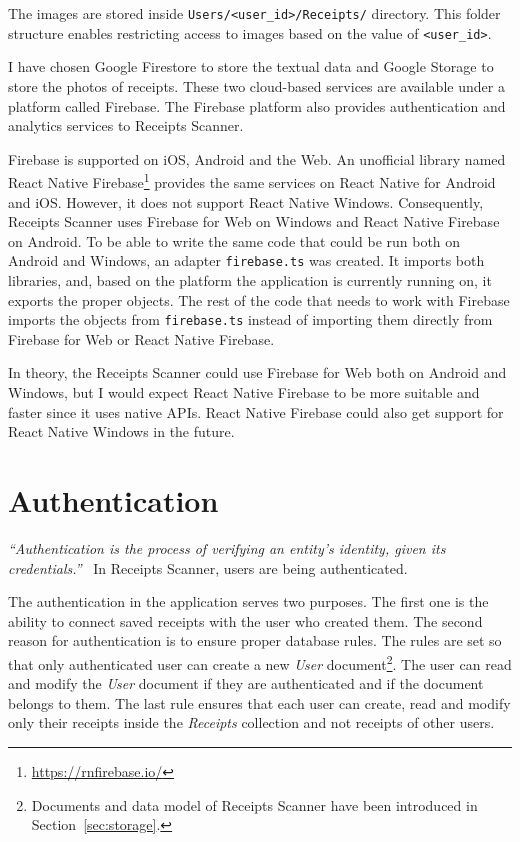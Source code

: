 \documentclass[
  digital, %
  table,   %
  oneside, %
  lof,     %
  lot,     %
]{fithesis3}
\begin{document}
The images are stored inside \texttt{Users/<user\_id>/Receipts/} directory. This folder structure enables restricting access to images based on the value of \texttt{<user\_id>}.

I have chosen Google Firestore to store the textual data and Google Storage to store the photos of receipts. These two cloud-based services are available under a platform called Firebase. The Firebase platform also provides authentication and analytics services to Receipts Scanner.

\label{phantom:firebase_adapter}
Firebase is supported on iOS, Android and the Web. An unofficial library named React Native Firebase\footnote{\url{https://rnfirebase.io/}} provides the same services on React Native for Android and iOS. However, it does not support React Native Windows. Consequently, Receipts Scanner uses Firebase for Web on Windows and React Native Firebase on Android. To be able to write the same code that could be run both on Android and Windows, an adapter \texttt{firebase.ts} was created. It imports both libraries, and, based on the platform the application is currently running on, it exports the proper objects. The rest of the code that needs to work with Firebase imports the objects from \texttt{firebase.ts} instead of importing them directly from Firebase for Web or React Native Firebase.

In theory, the Receipts Scanner could use Firebase for Web both on Android and Windows, but I would expect React Native Firebase to be more suitable and faster since it uses native APIs. React Native Firebase could also get support for React Native Windows in the future.

\section{Authentication}
\label{ref:authentication}
\textit{``Authentication is the process of verifying an entity’s identity, given its credentials.''}~\cite{Cankaya2011Authentication} In Receipts Scanner, users are being authenticated.

The authentication in the application serves two purposes. The first one is the ability to connect saved receipts with the user who created them. The second reason for authentication is to ensure proper database rules. The rules are set so that only authenticated user can create a new \textit{User} document\footnote{Documents and data model of Receipts Scanner have been introduced in Section~\ref{sec:storage}.}. The user can read and modify the \textit{User} document if they are authenticated and if the document belongs to them. The last rule ensures that each user can create, read and modify only their receipts inside the \textit{Receipts} collection and not receipts of other users.
\end{document}
